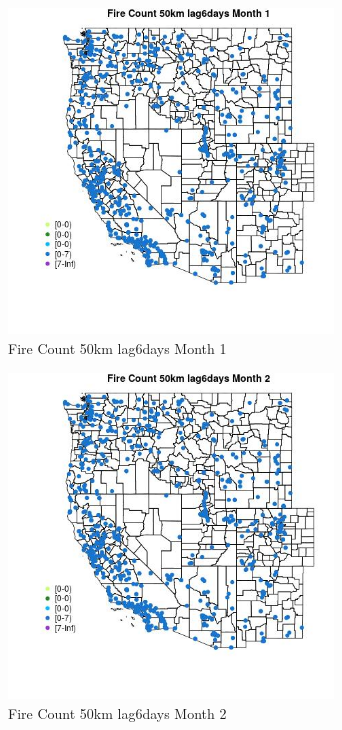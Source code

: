 \begin{figure} 
\centering  
\includegraphics[width=0.77\textwidth]{Code_Outputs/Report_ML_input_PM25_Step4_part_e_de_duplicated_aves_compiled_2019-05-21wNAs_MapObsMo1Fire_Count_50km_lag6days.jpg} 
\caption{\label{fig:Report_ML_input_PM25_Step4_part_e_de_duplicated_aves_compiled_2019-05-21wNAsMapObsMo1Fire_Count_50km_lag6days}Fire Count 50km lag6days Month 1} 
\end{figure} 
 

\begin{figure} 
\centering  
\includegraphics[width=0.77\textwidth]{Code_Outputs/Report_ML_input_PM25_Step4_part_e_de_duplicated_aves_compiled_2019-05-21wNAs_MapObsMo2Fire_Count_50km_lag6days.jpg} 
\caption{\label{fig:Report_ML_input_PM25_Step4_part_e_de_duplicated_aves_compiled_2019-05-21wNAsMapObsMo2Fire_Count_50km_lag6days}Fire Count 50km lag6days Month 2} 
\end{figure} 
 

